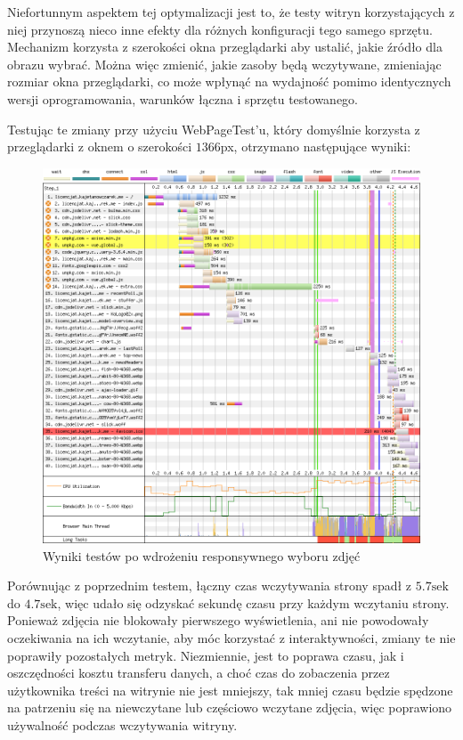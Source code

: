 \documentclass[licencjacka]{pracadypl}
\begin{document}
Niefortunnym aspektem tej optymalizacji jest to, że testy witryn korzystających z niej przynoszą nieco inne efekty dla różnych konfiguracji tego samego sprzętu. Mechanizm korzysta z szerokości okna przeglądarki aby ustalić, jakie źródło dla obrazu wybrać. Można więc zmienić, jakie zasoby będą wczytywane, zmieniając rozmiar okna przeglądarki, co może wpłynąć na wydajność pomimo identycznych wersji oprogramowania, warunków łączna i sprzętu testowanego.

Testując te zmiany przy użyciu WebPageTest'u, który domyślnie korzysta z przeglądarki z oknem o szerokości $1366$px, otrzymano następujące wyniki:

\begin{figure}[H]
  \includegraphics[width=\linewidth]{images/waterfall-after-sizing.png}
  \caption{Wyniki testów po wdrożeniu responsywnego wyboru zdjęć}
  \label{fig:waterfall-after-sizing}
\end{figure}

Porównując z poprzednim testem, łączny czas wczytywania strony spadł z $5.7\text{sek}$ \linebreak do $4.7\text{sek}$, więc udało się odzyskać sekundę czasu przy każdym wczytaniu strony. Ponieważ zdjęcia nie blokowały pierwszego wyświetlenia, ani nie powodowały oczekiwania na ich wczytanie, aby móc korzystać z interaktywności, zmiany te nie poprawiły pozostałych metryk. Niezmiennie, jest to poprawa czasu, jak i oszczędności kosztu transferu danych, a choć czas do zobaczenia przez użytkownika treści na witrynie nie jest mniejszy, tak mniej czasu będzie spędzone na patrzeniu się na niewczytane lub częściowo wczytane zdjęcia, więc poprawiono używalność podczas wczytywania witryny.
\end{document}
